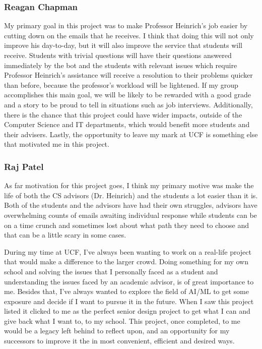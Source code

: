 \documentclass[titlepage, 12pt]{article}
\begin{document}
\subsubsection{Reagan Chapman}

My primary goal in this project was to make Professor Heinrich’s job easier by cutting down on the emails that he receives. I think that doing this will not only improve his day-to-day, but it will also improve the service that students will receive. Students with trivial questions will have their questions answered immediately by the bot and the students with relevant issues which require Professor Heinrich’s assistance will receive a resolution to their problems quicker than before, because the professor’s workload will be lightened. If my group accomplishes this main goal, we will be likely to be rewarded with a good grade and a story to be proud to tell in situations such as job interviews. Additionally, there is the chance that this project could have wider impacts, outside of the Computer Science and IT departments, which would benefit more students and their advisers. Lastly, the opportunity to leave my mark at UCF is something else that motivated me in this project.

\subsubsection{Raj Patel}

As far motivation for this project goes, I think my primary motive was make the life of both the CS advisors (Dr. Heinrich) and the students a lot easier than it is. Both of the students and the advisors have had their own struggles, advisors have overwhelming counts of emails awaiting individual response while students can be on a time crunch and sometimes lost about what path they need to choose and that can be a little scary in some cases. 

During my time at UCF, I’ve always been wanting to work on a real-life project that would make a difference to the larger crowd. Doing something for my own school and solving the issues that I personally faced as a student and understanding the issues faced by an academic advisor, is of great importance to me. Besides that, I’ve always wanted to explore the field of AI/ML to get some exposure and decide if I want to pursue it in the future. When I saw this project listed it clicked to me as the perfect senior design project to get what I can and give back what I want to, to my school. This project, once completed, to me would be a legacy left behind to reflect upon, and an opportunity for my successors to improve it the in most convenient, efficient and desired ways. 
\end{document}
